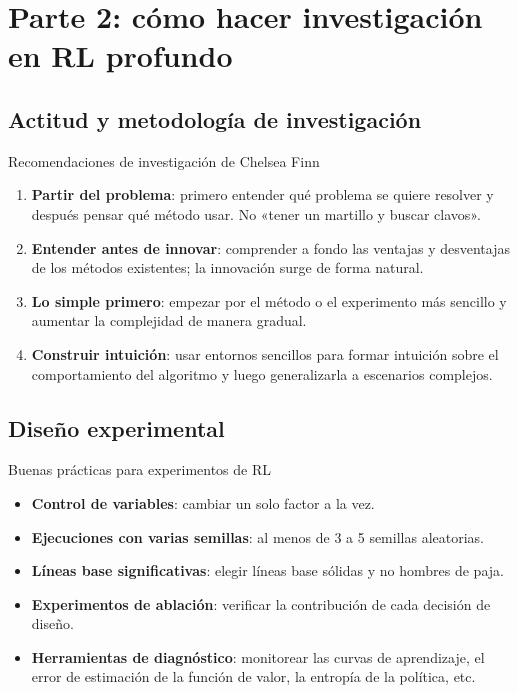 \section{Parte 2: cómo hacer investigación en RL profundo}

\subsection{Actitud y metodología de investigación}

\begin{importantbox}{Recomendaciones de investigación de Chelsea Finn}
\begin{enumerate}
    \item \textbf{Partir del problema}: primero entender qué problema se quiere resolver y después pensar qué método usar. No «tener un martillo y buscar clavos».
    \item \textbf{Entender antes de innovar}: comprender a fondo las ventajas y desventajas de los métodos existentes; la innovación surge de forma natural.
    \item \textbf{Lo simple primero}: empezar por el método o el experimento más sencillo y aumentar la complejidad de manera gradual.
    \item \textbf{Construir intuición}: usar entornos sencillos para formar intuición sobre el comportamiento del algoritmo y luego generalizarla a escenarios complejos.
\end{enumerate}
\end{importantbox}

\subsection{Diseño experimental}

\begin{knowledgebox}{Buenas prácticas para experimentos de RL}
\begin{itemize}
    \item \textbf{Control de variables}: cambiar un solo factor a la vez.
    \item \textbf{Ejecuciones con varias semillas}: al menos de 3 a 5 semillas aleatorias.
    \item \textbf{Líneas base significativas}: elegir líneas base sólidas y no hombres de paja.
    \item \textbf{Experimentos de ablación}: verificar la contribución de cada decisión de diseño.
    \item \textbf{Herramientas de diagnóstico}: monitorear las curvas de aprendizaje, el error de estimación de la función de valor, la entropía de la política, etc.
\end{itemize}
\end{knowledgebox}


